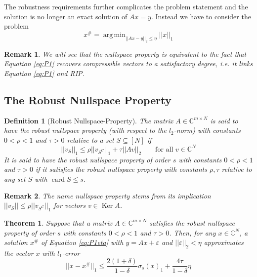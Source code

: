 \documentclass[10pt,a4paper]{article}
\theoremstyle{thmstyle}
\newtheorem{definition}{Definition}
\newtheorem{theorem}{Theorem}
\newtheorem{remark}{Remark}
\DeclareMathOperator{\Ker}{Ker}
\DeclareMathOperator{\card}{card}
\DeclareMathOperator{\argmin}{arg\,min}
\begin{document}
The robustness requirements further complicates the problem statement and the solution is no longer an exact solution of $Ax = y$.
Instead we have to consider the problem
\begin{equation}
  x^{\#} = \argmin_{||Ax - y||_{2} \le \eta} ||x||_{1} \label{eq:P1eta}
\end{equation}

\begin{remark}
  We will see that the nullspace property is equivalent to the fact that Equation \eqref{eq:P1} recovers compressible vectors to a satisfactory degree, i.e. it links Equation \eqref{eq:P1} and RIP.
\end{remark}

\subsection{The Robust Nullspace Property}

\begin{definition}[Robust Nullspace-Property]
  The matrix $A \in \mathbb{C}^{m \times N}$ is said to have the \emph{robust nullspace property} (with respect to the $l_{2}$-norm) with constants $0 < \rho < 1$ and $\tau > 0$ relative to a set $S \subseteq [N]$ if
  \begin{equation*}
    ||v_{S}||_{1} \le \rho||v_{S^{C}}||_{1} + \tau ||Av||_{2} \qquad \text{for all $v \in \mathbb{C}^{N}$}
  \end{equation*}
  It is said to have the \emph{robust nullspace property of order $s$} with constants $0 < \rho < 1$ and $\tau > 0$ if it satisfies the robust nullspace property with constants $\rho, \tau$ relative to any set $S$ with $\card S \le s$.
\end{definition}

\begin{remark}
  The name nullspace property stems from its implication $||v_{S}|| \le \rho||v_{S^{C}}||_{1}$ for vectors $v \in \Ker A$.
\end{remark}

\begin{theorem}
  Suppose that a matrix $A \in \mathbb{C}^{m \times N}$ satisfies the robust nullspace property of order $s$ with constants $0 < \rho < 1$ and $\tau > 0$.
  Then, for any $x \in \mathbb{C}^{N}$, a solution $x^{\#}$ of Equation \eqref{eq:P1eta} with $y = Ax + \varepsilon$ and $||\varepsilon||_{2} < \eta$ approximates the vector $x$ with $l_{1}$-error
  \begin{equation*}
    ||x - x^{\#}||_{1} \le \frac{2(1 + \delta)}{1 - \delta}\sigma_{s}(x)_{1} + \frac{4\tau}{1 - \delta}\eta
  \end{equation*}
\end{theorem}
\end{document}
